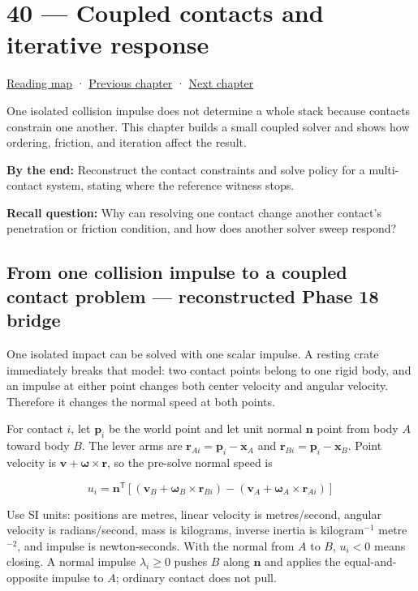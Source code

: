 \hypertarget{06-engine-ii-ch040}{}
\chapter{40 --- Coupled contacts and iterative response}\label{06-engine-ii-ch040-coupled-contacts-and-iterative-response}

\hyperref[volume-reading-map]{Reading map} · \hyperref[06-engine-ii-ch039-composable-timesteps-and-stable-simulation-policy]{Previous chapter} · \hyperref[06-engine-ii-ch041-evidence-tools-and-revisable-design]{Next chapter}

One isolated collision impulse does not determine a whole stack because contacts constrain one another. This chapter builds a small coupled solver and shows how ordering, friction, and iteration affect the result.

\textbf{By the end:} Reconstruct the contact constraints and solve policy for a multi-contact system, stating where the reference witness stops.

\textbf{Recall question:} Why can resolving one contact change another contact's penetration or friction condition, and how does another solver sweep respond?

\section{From one collision impulse to a coupled contact problem --- reconstructed Phase 18 bridge}\label{06-engine-ii-ch040-from-one-collision-impulse-to-a-coupled-contact-problem-reconstructed-phase-18-bridge}

One isolated impact can be solved with one scalar impulse. A resting crate immediately breaks that model: two contact points belong to one rigid body, and an impulse at either point changes both center velocity and angular velocity. Therefore it changes the normal speed at both points.

For contact \(i\), let \(\mathbf p_i\) be the world point and let unit normal \(\mathbf n\) point from body \(A\) toward body \(B\). The lever arms are \(\mathbf r_{Ai}=\mathbf p_i-\mathbf x_A\) and \(\mathbf r_{Bi}=\mathbf p_i-\mathbf x_B\). Point velocity is \(\mathbf v+\boldsymbol\omega\times\mathbf r\), so the pre-solve normal speed is

\[
u_i=\mathbf n^\mathsf T\left[(\mathbf v_B+\boldsymbol\omega_B\times\mathbf r_{Bi})-(\mathbf v_A+\boldsymbol\omega_A\times\mathbf r_{Ai})\right]
\]

Use SI units: positions are metres, linear velocity is metres/second, angular velocity is radians/second, mass is kilograms, inverse inertia is kilogram\(^{-1}\) metre\(^{-2}\), and impulse is newton-seconds. With the normal from \(A\) to \(B\), \(u_i<0\) means closing. A normal impulse \(\lambda_i\ge0\) pushes \(B\) along \(\mathbf n\) and applies the equal-and-opposite impulse to \(A\); ordinary contact does not pull.


